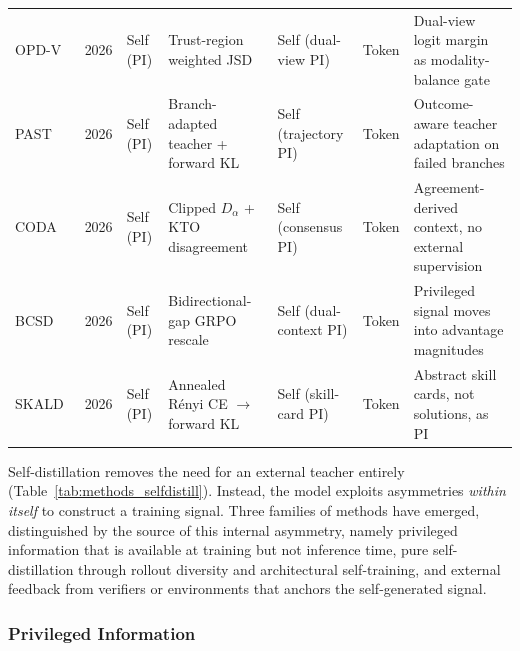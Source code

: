 \documentclass{article} %
\begin{document}
\begin{table}[t]
{\begin{tabular}{@{}lclllll@{}}
        OPD-V~\citep{2608.05131} & 2026 & Self (PI) & Trust-region weighted JSD & Self (dual-view PI) & Token & Dual-view logit margin as modality-balance gate \\
        PAST~\citep{2608.08726} & 2026 & Self (PI) & Branch-adapted teacher + forward KL & Self (trajectory PI) & Token & Outcome-aware teacher adaptation on failed branches \\
        CODA~\citep{2608.08764} & 2026 & Self (PI) & Clipped $D_\alpha$ + KTO disagreement & Self (consensus PI) & Token & Agreement-derived context, no external supervision \\
        BCSD~\citep{2608.09555} & 2026 & Self (PI) & Bidirectional-gap GRPO rescale & Self (dual-context PI) & Token & Privileged signal moves into advantage magnitudes \\
        SKALD~\citep{2608.09826} & 2026 & Self (PI) & Annealed R\'enyi CE $\to$ forward KL & Self (skill-card PI) & Token & Abstract skill cards, not solutions, as PI \\
        \bottomrule
    \end{tabular}
    }
\end{table}

Self-distillation removes the need for an external teacher entirely (Table~\ref{tab:methods_selfdistill}). Instead, the model exploits asymmetries \emph{within itself} to construct a training signal. Three families of methods have emerged, distinguished by the source of this internal asymmetry, namely privileged information that is available at training but not inference time, pure self-distillation through rollout diversity and architectural self-training, and external feedback from verifiers or environments that anchors the self-generated signal.

\subsubsection{Privileged Information}
\label{subsec:self_pi}
\end{document}
